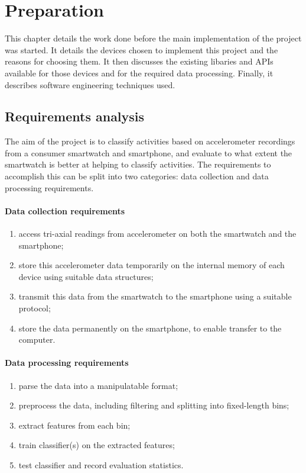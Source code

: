 \chapter{Preparation}
  This chapter details the work done before the main implementation of the project was started. It
  details the devices chosen to implement this project and the reasons for choosing them. It then
  discusses the existing libaries and APIs available for those devices and for the required data
  processing. Finally, it describes software engineering techniques used.

  \section{Requirements analysis}
    The aim of the project is to classify activities based on accelerometer recordings from a consumer smartwatch and smartphone, and evaluate to what extent the smartwatch is better at helping to classify activities. The requirements to accomplish this can be split into two categories: data collection and data processing requirements.
    
    \subsubsection{Data collection requirements}
      \begin{enumerate}
        \item access tri-axial readings from accelerometer on both the smartwatch and the smartphone;
        \item store this accelerometer data temporarily on the internal memory of each device using suitable data structures;
        \item transmit this data from the smartwatch to the smartphone using a suitable protocol;
        \item store the data permanently on the smartphone, to enable transfer to the computer.
      \end{enumerate}
    
    \subsubsection{Data processing requirements}
      \begin{enumerate}
        \item parse the data into a manipulatable format;
        \item preprocess the data, including filtering and splitting into fixed-length bins;
        \item extract features from each bin;
        \item train classifier(s) on the extracted features;
        \item test classifier and record evaluation statistics.
      \end{enumerate}
    
